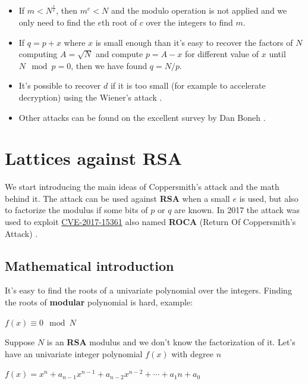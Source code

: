 \documentclass[a4paper,12pt]{report}
\begin{document}
\begin{itemize}
    \item If $m < N^{\frac{1}{e}}$, then $m^e < N$ and the modulo operation is not applied and we only need to find the $e$th root of $c$ over the
        integers to find $m$.
    \item If $q = p + x$ where $x$ is small enough than it's easy to recover the factors of $N$ computing $A = \sqrt{N}$ and compute
            $p = A - x$ for different value of $x$ until $N \mod p = 0$, then we have found $q = N / p$.
    \item It's possible to recover $d$ if it is too small (for example to accelerate decryption) using the Wiener's attack \cite{wiener}.
    \item Other attacks can be found on the excellent survey by Dan Boneh \cite{boneh99twentyyears}.
\end{itemize}

\section{Lattices against RSA}

We start introducing the main ideas of Coppersmith's attack \cite{coppersmith96} and the math behind it.
The attack can be used against \textbf{RSA} when a small $e$ is used, but also
to factorize the modulus if some bits of $p$ or $q$ are known. In 2017 the attack was used to exploit
\href{https://cve.mitre.org/cgi-bin/cvename.cgi?name=CVE-2017-15361}{CVE-2017-15361} also named \textbf{ROCA}
(Return Of Coppersmith's Attack) \cite{roca}.

\subsection{Mathematical introduction}

It's easy to find the roots of a univariate polynomial over the integers. Finding the roots of \textbf{modular} polynomial is hard, example:

\begin{center}
    $f(x) \equiv 0 \mod N$
\end{center}

Suppose $N$ is an \textbf{RSA} modulus and we don't know the factorization of it. Let's have an univariate integer polynomial $f(x)$ with degree $n$

\begin{center}
    $f(x) = x^n + a_{n-1}x^{n-1} + a_{n-2}x^{n-2} + \cdots + a_1n + a_0$
\end{center}
\end{document}
